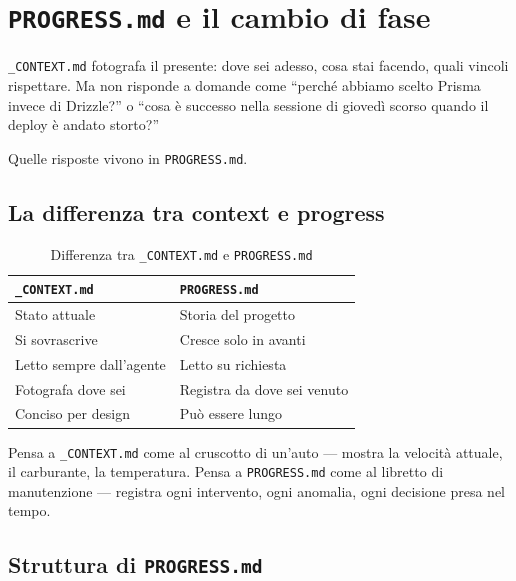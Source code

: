 
\chapter{\texttt{PROGRESS.md} e il cambio di fase}
\label{ch:progress-md}

\texttt{\_CONTEXT.md} fotografa il presente: dove sei adesso, cosa stai facendo, quali vincoli rispettare. Ma non risponde a domande come ``perché abbiamo scelto Prisma invece di Drizzle?'' o ``cosa è successo nella sessione di giovedì scorso quando il deploy è andato storto?''

Quelle risposte vivono in \texttt{PROGRESS.md}.

\section{La differenza tra context e progress}
\label{sec:05-differenza}

\begin{table}[htbp]
  \centering
  \begin{tabular}{ll}
    \toprule
    \textbf{\texttt{\_CONTEXT.md}} & \textbf{\texttt{PROGRESS.md}} \\
    \midrule
    Stato attuale & Storia del progetto \\
    Si sovrascrive & Cresce solo in avanti \\
    Letto sempre dall'agente & Letto su richiesta \\
    Fotografa dove sei & Registra da dove sei venuto \\
    Conciso per design & Può essere lungo \\
    \bottomrule
  \end{tabular}
  \caption{Differenza tra \texttt{\_CONTEXT.md} e \texttt{PROGRESS.md}}
  \label{tab:05-context-vs-progress}
\end{table}

Pensa a \texttt{\_CONTEXT.md} come al cruscotto di un'auto --- mostra la velocità attuale, il carburante, la temperatura. Pensa a \texttt{PROGRESS.md} come al libretto di manutenzione --- registra ogni intervento, ogni anomalia, ogni decisione presa nel tempo.

\section{Struttura di \texttt{PROGRESS.md}}
\label{sec:05-struttura}

